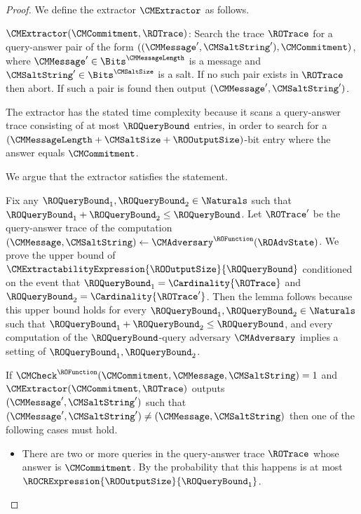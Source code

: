 \begin{proof}
We define the extractor $\CMExtractor$ as follows.
\begin{center}
\begin{minipage}{0.9\textwidth}
$\CMExtractor(\CMCommitment,\ROTrace)$:
Search the trace $\ROTrace$ for a query-answer pair of the form $((\CMMessage',\CMSaltString'),\CMCommitment)$, where $\CMMessage' \in \Bits^{\CMMessageLength}$ is a message and $\CMSaltString' \in \Bits^{\CMSaltSize}$ is a salt. If no such pair exists in $\ROTrace$ then abort. If such a pair is found then output $(\CMMessage',\CMSaltString')$.
\end{minipage}
\end{center}
The extractor has the stated time complexity because it scans a query-answer trace consisting of at most $\ROQueryBound$ entries, in order to search for a $(\CMMessageLength + \CMSaltSize + \ROOutputSize)$-bit entry where the answer equals $\CMCommitment$.

We argue that the extractor satisfies the statement.

Fix any $\ROQueryBound_{1},\ROQueryBound_{2} \in \Naturals$ such that $\ROQueryBound_{1} + \ROQueryBound_{2} \leq \ROQueryBound$. Let $\ROTrace'$ be the query-answer trace of the computation $(\CMMessage,\CMSaltString) \gets \CMAdversary^{\ROFunction}(\ROAdvState)$. We prove the upper bound of $\CMExtractabilityExpression{\ROOutputSize}{\ROQueryBound}$ conditioned on the event that $\ROQueryBound_{1} = \Cardinality{\ROTrace}$ and $\ROQueryBound_{2} = \Cardinality{\ROTrace'}$. Then the lemma follows because this upper bound holds for every $\ROQueryBound_{1},\ROQueryBound_{2} \in \Naturals$ such that $\ROQueryBound_{1} + \ROQueryBound_{2} \leq \ROQueryBound$, and every computation of the $\ROQueryBound$-query adversary $\CMAdversary$ implies a setting of $\ROQueryBound_{1},\ROQueryBound_{2}$.

If $\CMCheck^{\ROFunction}(\CMCommitment,\CMMessage,\CMSaltString)=1$ and $\CMExtractor(\CMCommitment,\ROTrace)$ outputs $(\CMMessage',\CMSaltString')$ such that $(\CMMessage',\CMSaltString') \neq (\CMMessage,\CMSaltString)$ then one of the following cases must hold.
\begin{itemize}

  \item There are two or more queries in the query-answer trace $\ROTrace$ whose answer is $\CMCommitment$. By  the probability that this happens is at most $\ROCRExpression{\ROOutputSize}{\ROQueryBound_{1}}$.


\end{itemize}
\end{proof}
